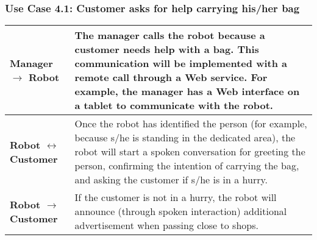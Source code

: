 \subsubsection*{Use Case 4.1: Customer asks for help carrying his/her bag}

\begin{tabular}{|l|l|}

\hline
{\bf Manager  $\rightarrow$ Robot} &
\begin{minipage}{11cm}
\vspace{1em}
The manager calls the robot because a customer needs help with a bag.
This communication will be implemented with a remote call through a Web service.
For example, the manager has a Web interface on a tablet to communicate with the robot.
\vspace{1em}
\end{minipage}

\\ \hline

{\bf Robot  $\leftrightarrow$ Customer} &
\begin{minipage}{11cm}
\vspace{1em}
Once the robot has identified the person (for example, because s/he is standing in the dedicated area),
the robot will start a spoken conversation for greeting the person, confirming the intention of carrying the bag, and asking the customer if s/he is in a hurry.
\vspace{1em}
\end{minipage}

 \\ \hline


{\bf Robot  $\rightarrow$ Customer} &
\begin{minipage}{11cm}
\vspace{1em}
If the customer is not in a hurry, the robot will announce (through spoken interaction) additional advertisement when passing close to shops.
\vspace{1em}
\end{minipage}

 \\ \hline

\end{tabular}



